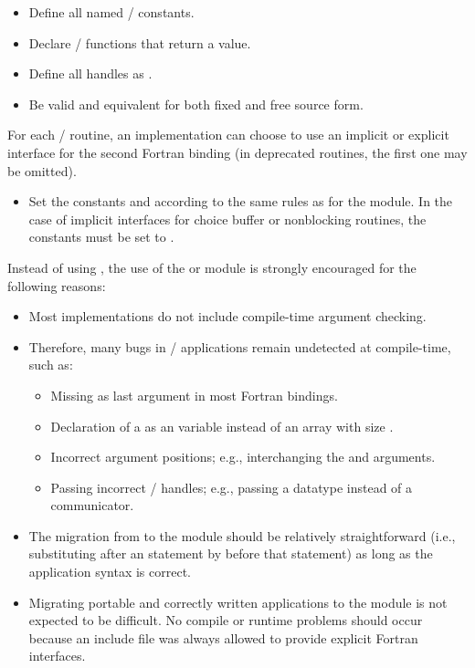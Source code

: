 \begin{itemize}
\item Define all named \MPI/ constants.
\item Declare \MPI/ functions that return a value.
\item Define all handles as .
\item Be valid and equivalent for both
      fixed and free source form.
\end{itemize}
For each \MPI/ routine, an implementation can choose
to use an implicit or explicit interface
for the second Fortran binding
(in deprecated routines, the first one may be omitted).
\begin{itemize}
\item Set the  constants
       and
      according to the same rules as for the
       module.
      In the case of implicit interfaces for choice buffer
      or nonblocking routines, the constants must be set
      to .
\end{itemize}
\begin{users}
  Instead of using , the use of the  or
   module is strongly encouraged
  for the following reasons:
  \begin{itemize}
  \item Most  implementations do not include
        compile-time argument checking.
  \item Therefore, many bugs in \MPI/ applications remain
        undetected at compile-time, such as:
        \begin{itemize}
        \item Missing  as last argument in
              most Fortran bindings.
        \item Declaration of a  as an 
              variable instead of an  array with
              size .
        \item Incorrect argument positions; e.g., interchanging the
               and  arguments.
        \item Passing incorrect \MPI/ handles;
              e.g., passing a datatype instead of a communicator.
        \end{itemize}
  \item The migration from  to the  module
        should be relatively straightforward
        (i.e., substituting  after
        an  statement by 
        before that  statement)
        as long as the application syntax is correct.
  \item Migrating portable and correctly written
        applications to the  module
        is not expected to be difficult. No compile or runtime
        problems should occur because an  include file
        was always allowed to provide explicit
        Fortran interfaces.
  \end{itemize}
\end{users}

